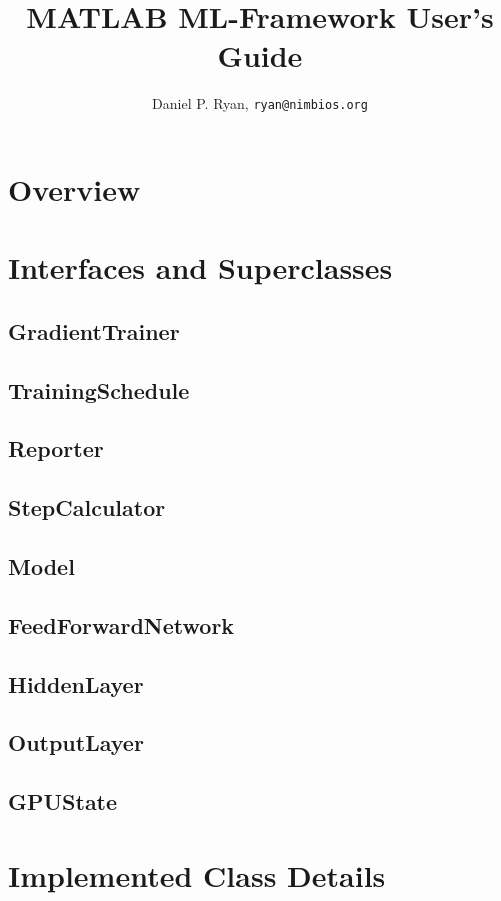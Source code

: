 \documentclass[12pt,letterpaper]{article}
\author{Daniel P. Ryan, \texttt{ryan@nimbios.org}}
\title{MATLAB ML-Framework User's Guide}
\begin{document}
\maketitle
\section*{Overview}

\section*{Interfaces and Superclasses}

\subsection*{GradientTrainer}

\subsection*{TrainingSchedule}

\subsection*{Reporter}

\subsection*{StepCalculator}

\subsection*{Model}

\subsection*{FeedForwardNetwork}

\subsection*{HiddenLayer}

\subsection*{OutputLayer}

\subsection*{GPUState}

\section*{Implemented Class Details}
\end{document}
